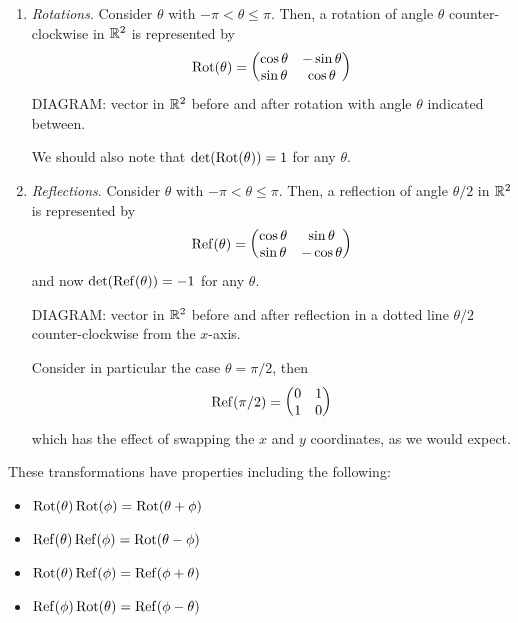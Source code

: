 \documentclass{../template/note}
\begin{document}
    \begin{enumerate}
        \item \emph{Rotations}. Consider \(\theta\) with \(-\pi < \theta \leq \pi\). Then, a rotation of angle \(\theta\) counter-clockwise in \(\mathbb R^2\) is represented by
        \[
            \operatorname{Rot}(\theta) = \begin{pmatrix}
             \cos \theta & -\sin \theta \\
             \sin \theta & \cos \theta \\
            \end{pmatrix}
        \]
        DIAGRAM: vector in \(\mathbb R^2\) before and after rotation with angle \(\theta\) indicated between.
        
        We should also note that \(\det(\operatorname{Rot}(\theta)) = 1\) for any \(\theta\).
        \item \emph{Reflections}. Consider \(\theta\) with \(-\pi < \theta \leq \pi\). Then, a reflection of angle \(\theta/2\) in \(\mathbb R^2\) is represented by
        \[
            \operatorname{Ref}(\theta) = \begin{pmatrix}
             \cos \theta & \sin \theta \\
             \sin \theta & -\cos \theta \\
            \end{pmatrix}
        \]
        and now \(\det(\operatorname{Ref}(\theta)) = -1\) for any \(\theta\).

        DIAGRAM: vector in \(\mathbb R^2\) before and after reflection in a dotted line \(\theta/2\) counter-clockwise from the \(x\)-axis.

        Consider in particular the case \(\theta = \pi/2\), then
        \[
            \operatorname{Ref}(\pi/2) = \begin{pmatrix}
             0 & 1 \\
             1 & 0 \\
            \end{pmatrix}
        \]
        which has the effect of swapping the \(x\) and \(y\) coordinates, as we would expect.
    \end{enumerate}
    
    
    These transformations have properties including the following:

    \begin{itemize}
        \item \(\operatorname{Rot}(\theta)\operatorname{Rot}(\phi) = \operatorname{Rot}(\theta + \phi)\)
        \item \(\operatorname{Ref}(\theta)\operatorname{Ref}(\phi) = \operatorname{Rot}(\theta - \phi)\)
        \item \(\operatorname{Rot}(\theta)\operatorname{Ref}(\phi) = \operatorname{Ref}(\phi + \theta)\)
        \item \(\operatorname{Ref}(\phi)\operatorname{Rot}(\theta) = \operatorname{Ref}(\phi - \theta)\)
    \end{itemize}
\end{document}
